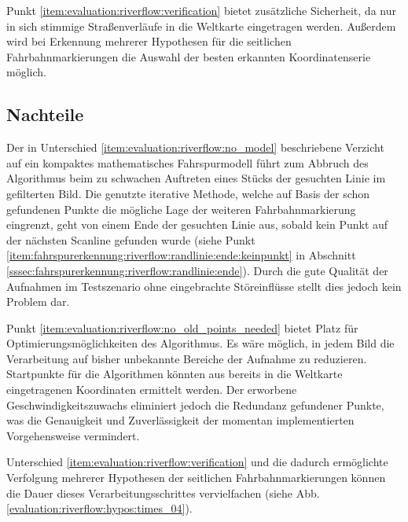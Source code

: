 Punkt \ref{item:evaluation:riverflow:verification} bietet zusätzliche Sicherheit, da nur in sich stimmige Straßenverläufe in die Weltkarte eingetragen werden. Außerdem wird bei Erkennung mehrerer Hypothesen für die seitlichen Fahrbahnmarkierungen die Auswahl der besten erkannten Koordinatenserie möglich.

\subsection{Nachteile}
\label{ssec:evaluation:riverflow:diskussion_prinzip:nachteile}
Der in Unterschied \ref{item:evaluation:riverflow:no_model} beschriebene Verzicht auf ein kompaktes mathematisches Fahrspurmodell führt zum Abbruch des Algorithmus beim zu schwachen Auftreten eines Stücks der gesuchten Linie im gefilterten Bild. Die genutzte iterative Methode, welche auf Basis der schon gefundenen Punkte die mögliche Lage der weiteren Fahrbahnmarkierung eingrenzt, geht von einem Ende der gesuchten Linie aus, sobald kein Punkt auf der nächsten Scanline gefunden wurde (siehe Punkt \ref{item:fahrspurerkennung:riverflow:randlinie:ende:keinpunkt} in Abschnitt \ref{sssec:fahrspurerkennung:riverflow:randlinie:ende}). Durch die gute Qualität der Aufnahmen im Testszenario ohne eingebrachte Störeinflüsse stellt dies jedoch kein  Problem dar.

Punkt \ref{item:evaluation:riverflow:no_old_points_needed} bietet Platz für Optimierungsmöglichkeiten des Algorithmus. Es wäre möglich, in jedem Bild die Verarbeitung auf bisher unbekannte Bereiche der Aufnahme zu reduzieren. Startpunkte für die Algorithmen könnten aus bereits in die Weltkarte eingetragenen Koordinaten ermittelt werden. Der erworbene Geschwindigkeitszuwachs eliminiert jedoch die Redundanz gefundener Punkte, was die Genauigkeit und Zuverlässigkeit der momentan implementierten Vorgehensweise vermindert.

Unterschied \ref{item:evaluation:riverflow:verification} und die dadurch ermöglichte Verfolgung mehrerer Hypothesen der seitlichen Fahrbahnmarkierungen können die Dauer dieses Verarbeitungsschrittes vervielfachen (siehe Abb. \ref{evaluation:riverflow:hypos:times_04}).
